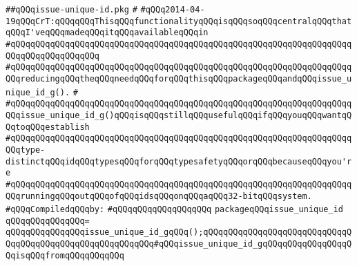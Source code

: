 \label{src/lib/src/issue-unique-id.pkg}
\verb|##qQQqissue-unique-id.pkg|\newline
\verb|#|\newline
\verb|#qQQq2014-04-19qQQqCrT:qQQqqQQqThisqQQqfunctionalityqQQqisqQQqsoqQQqcentralqQQqthatqQQqI'veqQQqmadeqQQqitqQQqavailableqQQqin|\newline
\verb|#qQQqqQQqqQQqqQQqqQQqqQQqqQQqqQQqqQQqqQQqqQQqqQQqqQQqqQQqqQQqqQQqqQQqqQQqqQQqqQQqqQQqqQQq|\newline
\verb|#qQQqqQQqqQQqqQQqqQQqqQQqqQQqqQQqqQQqqQQqqQQqqQQqqQQqqQQqqQQqqQQqqQQqqQQqreducingqQQqtheqQQqneedqQQqforqQQqthisqQQqpackageqQQqandqQQqissue_unique_id_g().|\newline
\verb|#|\newline
\verb|#qQQqqQQqqQQqqQQqqQQqqQQqqQQqqQQqqQQqqQQqqQQqqQQqqQQqqQQqqQQqqQQqqQQqqQQqissue_unique_id_g()qQQqisqQQqstillqQQqusefulqQQqifqQQqyouqQQqwantqQQqtoqQQqestablish|\newline
\verb|#qQQqqQQqqQQqqQQqqQQqqQQqqQQqqQQqqQQqqQQqqQQqqQQqqQQqqQQqqQQqqQQqqQQqqQQqtype-distinctqQQqidqQQqtypesqQQqforqQQqtypesafetyqQQqorqQQqbecauseqQQqyou're|\newline
\verb|#qQQqqQQqqQQqqQQqqQQqqQQqqQQqqQQqqQQqqQQqqQQqqQQqqQQqqQQqqQQqqQQqqQQqqQQqrunningqQQqoutqQQqofqQQqidsqQQqonqQQqaqQQq32-bitqQQqsystem.|\newline
\newline
\verb|#qQQqCompiledqQQqby:|\newline
\verb|#qQQqqQQqqQQqqQQqqQQq|\newline
\newline
\verb|packageqQQqissue_unique_id|\newline
\verb|qQQqqQQqqQQqqQQq=|\newline
\verb|qQQqqQQqqQQqqQQqissue_unique_id_gqQQq();qQQqqQQqqQQqqQQqqQQqqQQqqQQqqQQqqQQqqQQqqQQqqQQqqQQqqQQqqQQq#qQQqissue_unique_id_gqQQqqQQqqQQqqQQqqQQqisqQQqfromqQQqqQQqqQQq|\newline

